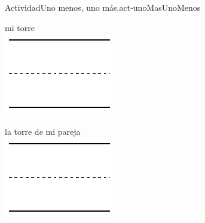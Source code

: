 \documentclass[20pt]{extarticle}
\begin{document}
\begin{activity}{Actividad}{Uno menos, uno más.}{act-unoMasUnoMenos}
\begin{sidebyside}{2}{0}{0.2}{0}%
\begin{sbspanel}{0.5}%
mi torre\\[0.6cm]
\includegraphics[max width=\linewidth]{external/svg-source/tikz-file-148545.pdf}
\end{sbspanel}%
\begin{sbspanel}{0.5}%
la torre de mi pareja\\[0.5cm]
\includegraphics[max width=\linewidth]{external/svg-source/tikz-file-148545.pdf}
\end{sbspanel}%
\end{sidebyside}%
\vspace*{1ex}
\begin{sidebyside}{2}{0}{0.2}{0}%

\end{sidebyside}
\end{activity}
\end{document}
